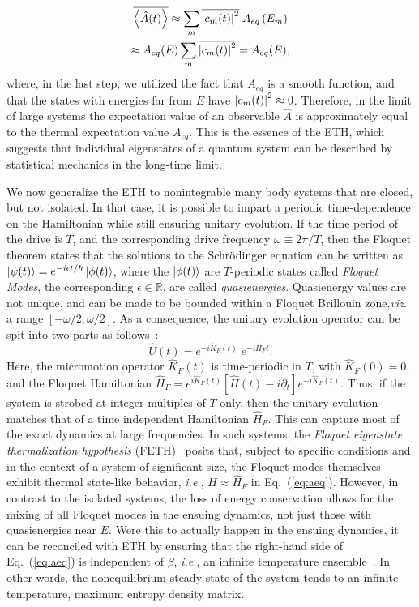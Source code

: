 \documentclass[%
reprint,
superscriptaddress,
amsmath,amssymb,
aps,
prb,
showkeys,
]{revtex4-2}
\begin{document}
\begin{multline*}
	\overline{\expval{\hat{A}(t)}} \approx \sum_m \overline{\abs{c_m(t)}^2}\; {A}_{eq}\left(E_m\right)\\
	\approx {A}_{eq}(E)\sum_m \overline{\abs{c_m(t)}^2} = A_{eq}(E),
\end{multline*}
where, in the last step, we utilized the fact that $A_{eq}$ is a smooth function, and that the states with energies far from $E$ have $\abs{c_m(t)}^2\approx 0$. Therefore, in the limit of large systems the expectation value of an observable $\hat{A}$ is approximately equal to the thermal expectation value $A_{eq}$. This is the essence of the ETH, which suggests that individual eigenstates of a quantum system can be described by statistical mechanics in the long-time limit.

We now generalize the ETH to nonintegrable many body systems that are closed, but not isolated. In that case, it is possible to impart a periodic time-dependence on the Hamiltonian while still ensuring unitary evolution. If the time period of the drive is $T$, and the corresponding drive frequency $\omega\equiv 2\pi/T$, then the Floquet theorem states that the solutions to the Schr\"{o}dinger equation can be written as $\ket{\psi(t)} = e^{-i\epsilon t/\hbar} \ket{\phi(t)}$, where the $\ket{\phi(t)}$ are $T$-periodic states called \textit{Floquet Modes}, the corresponding $\epsilon\in \mathbb{R}$, are called \textit{quasienergies}. Quasienergy values are not unique, and can be made to be bounded within a Floquet {Brillouin zone},\textit{viz.} a range $[-\omega/2, \omega/2]$\cite{holthaus_floquet_2016,vogl_effective_2020}. As a consequence, the unitary evolution operator can be spit into two parts as follows~\cite{Bukov2014}:
\begin{equation}
	\label{eq:propagator}
	\hat{U}(t) = e^{-i\hat{K}_F(t)}\;e^{-i\hat{H}_Ft}.
\end{equation}
Here, the micromotion operator $\hat{K}_F(t)$ is time-periodic in $T$, with $\hat{K}_F(0)=0$, and the Floquet Hamiltonian  {$\hat{H}_F = e^{i\hat{K}_F(t)} \left[\hat{H}(t)-i\partial_t\right] e^{-i \hat{K}_F(t)}$}. Thus, if the system is strobed at integer multiples of $T$ only, then the unitary evolution matches that of a time independent Hamiltonian $\hat{H}_F$. This can capture most of the exact dynamics at large frequencies. In such systems, the \textit{Floquet eigenstate thermalization hypothesis} (FETH)~\cite{Mori_2018, Mori_2023_1} posits that, subject to specific conditions and in the context of a system of significant size, the Floquet modes themselves exhibit thermal state-like behavior, \textit{i.e.}, $\hat{H}\approx \hat{H}_F$ in Eq.~(\ref{eq:aeq}). However, in contrast to the isolated systems, the loss of energy conservation allows for the mixing of all Floquet modes in the ensuing dynamics, not just those with quasienergies near $E$. Were this to actually happen in the ensuing dynamics,  it can be reconciled with ETH by ensuring that the right-hand side of Eq.~(\ref{eq:aeq}) is independent of $\beta$, \textit{i.e.}{, an infinite temperature ensemble}~\cite{alessio}. In other words, the nonequilibrium steady state of the system tends to an infinite temperature, maximum entropy density matrix.
\end{document}
